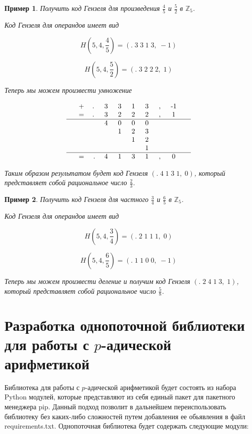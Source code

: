 \documentclass[master, och, diploma, times]{sty/SCWorks}
\theoremstyle{plain}
\newtheorem{exmp}{Пример}[section]
\theoremstyle{definition}
\begin{document}
\begin{exmp}
Получить код Гензеля для произведения $\frac{4}{5}$ и $\frac{5}{2}$ в $\mathbb{Z}_5$.

\noindent Код Гензеля для операндов имеет вид

$$H(5,4, \frac{4}{5})=(.\; 3\; 3\; 1\; 3,\; -1)$$

$$H(5,4, \frac{5}{2})=(.\; 3\; 2\; 2\; 2,\; 1)$$

\noindent Теперь мы можем произвести умножение

$$
\begin{tabular}{cccccccccc}
& + & .\; & 3\; & 3\; & 1\; & 3\; & ,\; & -1\; \\
& = & .\; & 3\; & 2\; & 2\; & 2\; & ,\; & 1\; \\
\hline
& & & 4\; & 0\; & 0\; & 0\; & & & \\
& & & & 1\; & 2\; & 3\; & & & \\
& & & & & 1\; & 2\; & & & \\
& & & & & & 1\; & & & \\
\hline
& = & . & 4\; & 1\; & 3\; & 1\; & ,\; & 0\; &
\end{tabular}
$$


\noindent Таким образом результатом будет код Гензеля $(.\; 4\; 1\; 3\; 1,\; 0)$, который представляет собой рациональное число $\frac{2}{3}$.
\end{exmp}



\begin{exmp}
Получить код Гензеля для частного $\frac{3}{4}$ и $\frac{6}{5}$ в $\mathbb{Z}_5$.

\noindent Код Гензеля для операндов имеет вид

$$H(5,4, \frac{3}{4})=(.\; 2\; 1\; 1\; 1,\; 0)$$

$$H(5,4, \frac{6}{5})=(.\; 1\; 1\; 0\; 0,\; -1)$$

\noindent Теперь мы можем произвести деление и получим код Гензеля $(.\; 2\; 4\; 1\; 3,\; 1)$, который представляет собой рациональное число $\frac{5}{8}$.
\end{exmp}


\section{Разработка однопоточной библиотеки для работы с $p$-адической арифметикой}

Библиотека для работы с $p$-адической арифметикой будет состоять из набора Python модулей, которые представляют из себя единый пакет для пакетного менеджера pip. Данный подход позволит в дальнейшем переиспользовать библиотеку без каких-либо сложностей путем добавления ее обьявления в файл requirements.txt. Однопоточная библиотека будет содержать следующие модули:
\end{document}

